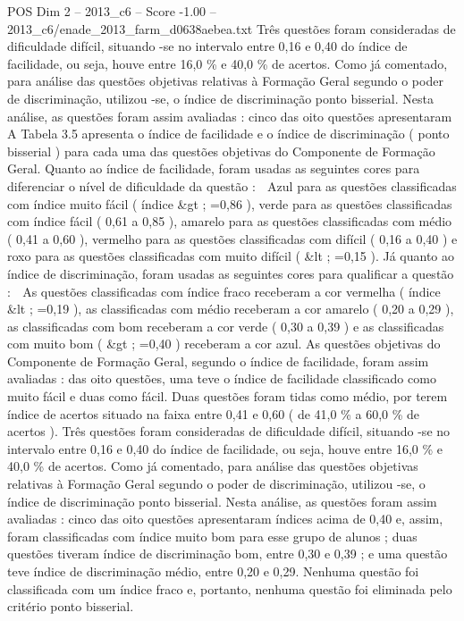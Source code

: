 \begin{textsample}{POS Dim 2 – 2013\_c6 – Score -1.00 – 2013\_c6/enade\_2013\_farm\_d0638aebea.txt}
Três questões foram consideradas de dificuldade difícil, situando -se no intervalo entre 0,16 e 0,40 do índice de facilidade, ou seja, houve entre 16,0 \% e 40,0 \% de acertos.
Como já comentado, para análise das questões objetivas relativas à Formação Geral segundo o poder de discriminação, utilizou -se, o índice de discriminação ponto bisserial.
Nesta análise, as questões foram assim avaliadas : cinco das oito questões apresentaram A Tabela 3.5 apresenta o índice de facilidade e o índice de discriminação ( ponto bisserial ) para cada uma das questões objetivas do Componente de Formação Geral.
Quanto ao índice de facilidade, foram usadas as seguintes cores para diferenciar o nível de dificuldade da questão :  Azul para as questões classificadas com índice muito fácil ( índice \&gt ; =0,86 ), verde para as questões classificadas com índice fácil ( 0,61 a 0,85 ), amarelo para as questões classificadas com médio ( 0,41 a 0,60 ), vermelho para as questões classificadas com difícil ( 0,16 a 0,40 ) e roxo para as questões classificadas com muito difícil ( \&lt ; =0,15 ).
Já quanto ao índice de discriminação, foram usadas as seguintes cores para qualificar a questão :  As questões classificadas com índice fraco receberam a cor vermelha ( índice \&lt ; =0,19 ), as classificadas com médio receberam a cor amarelo ( 0,20 a 0,29 ), as classificadas com bom receberam a cor verde ( 0,30 a 0,39 ) e as classificadas com muito bom ( \&gt ; =0,40 ) receberam a cor azul.
As questões objetivas do Componente de Formação Geral, segundo o índice de facilidade, foram assim avaliadas : das oito questões, uma teve o índice de facilidade classificado como muito fácil e duas como fácil.
Duas questões foram tidas como médio, por terem índice de acertos situado na faixa entre 0,41 e 0,60 ( de 41,0 \% a 60,0 \% de acertos ).
Três questões foram consideradas de dificuldade difícil, situando -se no intervalo entre 0,16 e 0,40 do índice de facilidade, ou seja, houve entre 16,0 \% e 40,0 \% de acertos.
Como já comentado, para análise das questões objetivas relativas à Formação Geral segundo o poder de discriminação, utilizou -se, o índice de discriminação ponto bisserial.
Nesta análise, as questões foram assim avaliadas : cinco das oito questões apresentaram índices acima de 0,40 e, assim, foram classificadas com índice muito bom para esse grupo de alunos ; duas questões tiveram índice de discriminação bom, entre 0,30 e 0,39 ; e uma questão teve índice de discriminação médio, entre 0,20 e 0,29.
Nenhuma questão foi classificada com um índice fraco e, portanto, nenhuma questão foi eliminada pelo critério ponto bisserial.

\end{textsample}
